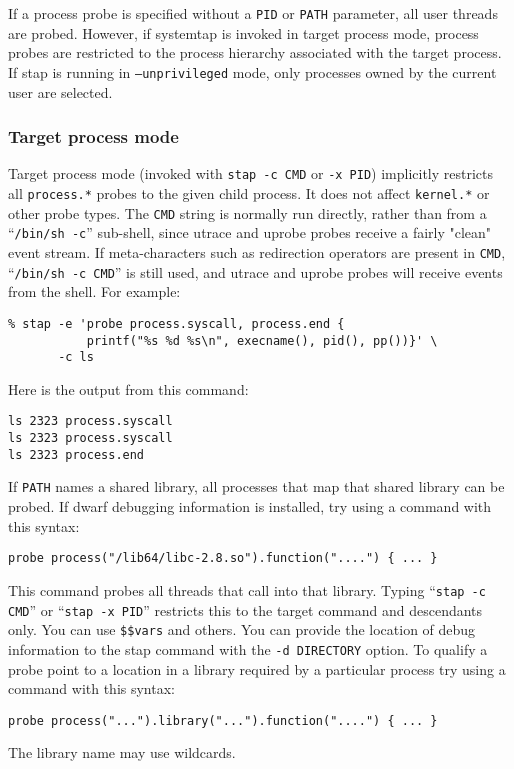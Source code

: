 \documentclass[twoside,english]{article}
\newenvironment{vindent}
{\begin{list}{}{\setlength{\listparindent}{6pt}}
\item[]}
{\end{list}}
\begin{document}
If a process probe is specified without a \texttt{PID} or
\texttt{PATH} parameter, all user threads are probed. However, if
systemtap is invoked in target process mode, process probes are
restricted to the process hierarchy associated with the target
process. If stap is running in \texttt{--unprivileged} mode, only
processes owned by the current user are selected.

\subsubsection{Target process mode}
\label{sec:targetprocessmode}
Target process mode (invoked with \texttt{stap -c CMD} or \texttt{-x
  PID}) implicitly restricts all \texttt{process.*} probes to the
given child process.  It does not affect \texttt{kernel.*} or other
probe types.  The \texttt{CMD} string is normally run directly, rather
than from a ``\texttt{/bin/sh -c}'' sub-shell, since utrace and uprobe
probes receive a fairly "clean" event stream.  If meta-characters such
as redirection operators are present in \texttt{CMD}, ``\texttt{/bin/sh
  -c CMD}'' is still used, and utrace and uprobe probes will receive
events from the shell. For example:
\begin{vindent}
\begin{verbatim}
% stap -e 'probe process.syscall, process.end {
           printf("%s %d %s\n", execname(), pid(), pp())}' \
       -c ls
\end{verbatim}
\end{vindent}

Here is the output from this command:
\begin{vindent}
\begin{verbatim}
ls 2323 process.syscall
ls 2323 process.syscall
ls 2323 process.end
\end{verbatim}
\end{vindent}

If \texttt{PATH} names a shared library, all processes that map that
shared library can be probed.  If dwarf debugging information is
installed, try using a command with this syntax:
\begin{vindent}
\begin{verbatim}
probe process("/lib64/libc-2.8.so").function("....") { ... }
\end{verbatim}
\end{vindent}
This command probes all threads that call into that library.  Typing
``\texttt{stap -c CMD}'' or ``\texttt{stap -x PID}'' restricts this to
the target command and descendants only.  You can use
\texttt{\$\$vars} and others. You can provide the location of debug
information to the stap command with the \texttt{-d DIRECTORY} option.
To qualify a probe point to a location in a library required by a
particular process try using a command with this syntax:
\begin{vindent}
\begin{verbatim}
probe process("...").library("...").function("....") { ... }
\end{verbatim}
\end{vindent}
The library name may use wildcards.
\end{document}
